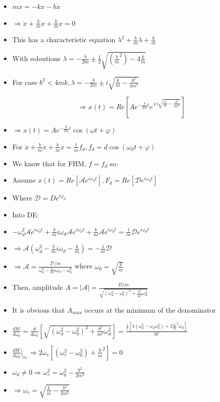 \documentclass{article}
\begin{document}
\begin{itemize}
    \item \(m\ddot x = -kx - b\dot x\)
    \item \(\Rightarrow \ddot x + \frac{b}{m}\dot x + \frac{k}{m} x = 0\)
    \item This has a characteristic equation \(\lambda^2 + \frac{b}{m}\lambda + \frac{k}{m}\)
    \item With soloutions \(\lambda = - \frac{b}{2m} \pm \frac{1}{2}\sqrt{(\frac{b}{m}^2)-4\frac{k}{m}}\)
    \item For case \(b^2 < 4mk, \lambda = -\frac{b}{2m} \pm i\sqrt{\frac{k}{m} - \frac{b^2}{4m^2}}\)

    \[\Rightarrow x(t) = Re[Ae^{-\frac{b}{2m}t}e^{\pm i\sqrt{\frac{k}{m}-\frac{b^2}{4m^2}}}]\]
    \item \(\Rightarrow\boxed{ x(t) = Ae^{-\frac{b}{2m}t}\cos(\omega t + \varphi)}\)
\end{itemize}


\begin{itemize}
    \item For \(\ddot x + \frac{b}{m}\dot x + \frac{k}{m}x = \frac{1}{m}f_d, f_d = d\cos(\omega_d t+\varphi)\)
    \item We know that for FHM, \(f=f_d\) so:
    \item Assume \({x(t)=Re[\mathcal{A}e^{i\omega_d t}], F_d=Re[\mathcal{D}e^{i\omega_d t}]}\) 
    \item Where \(\mathcal{D} = De^{i\varphi_d}\)
    \item Into DE:
    \item \(-\omega_d^2\mathcal{A}e^{i\omega_d t} + \frac{b}{m}i\omega_d\mathcal{A}e^{i\omega_d t}+\frac{k}{m}\mathcal{A}e^{i\omega_d t}=\frac{1}{m}\mathcal{D}e^{i\omega_d t}\)
    \item \(\Rightarrow \mathcal{A}(\omega_d^2-\frac{b}{m}i\omega_d-\frac{k}{m})=-\frac{1}{m}\mathcal{D}\)
    \item \(\Rightarrow \mathcal{A}=\frac{\mathcal{D}/m}{\omega_d^2-\frac{b}{m}i\omega_d-\omega_0^2}\) where \(\omega_0=\sqrt{\frac{k}{m}}\)
    \item Then, amplitude \(A=|\mathcal{A}|=\frac{D/m}{\sqrt{(\omega_d^2-\omega_0^2)^2+\frac{b^2}{m^2}\omega_d^2}}\)
    \item It is obvious that \(A_{max}\) occurs at the minimum of the denominator
    \item \(\frac{d\mathcal{W}}{d\omega_0}=\frac{d}{d\omega_0}[\sqrt{(\omega_d^2-\omega_0^2)^2+\frac{b^2}{m^2}\omega_d^2}]=\frac{\frac{1}{2}[4(\omega_d^3-\omega_d\omega_0^2)+2\frac{b}{m}^2\omega_d]}{\mathcal{W}}\)
    \item \(\frac{d\mathcal{W}}{d\omega_0}\rvert_{\omega_r}\Rightarrow 2\omega_r[(\omega_r^2-\omega_0^2)+\frac{b}{m}^2]=0\)
    \item \(\omega_d \not=0\Rightarrow\omega_r^2=\omega_0^2-\frac{b^2}{2m^2}\)
    \item \(\Rightarrow\boxed{\omega_r=\sqrt{\frac{k}{m}-\frac{b^2}{2m^2}}}\)
\end{itemize}
\end{document}
